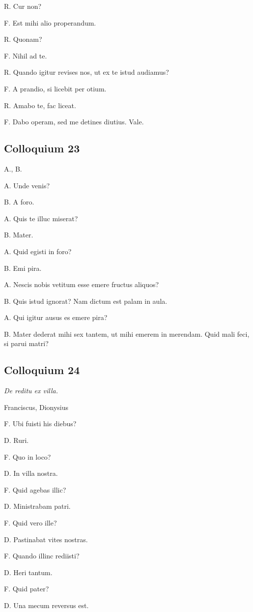 \documentclass{article}
\begin{document}
R. Cur non?

F. Est mihi alio properandum. 

R. Quonam?

F. Nihil ad te. 

R. Quando igitur revises nos, ut ex te istud audiamus?

F. A prandio, si licebit per otium. 

R. Amabo te, fac liceat. 

F. Dabo operam, sed me detines diutius. Vale. 

\subsection{Colloquium 23}
A., B.

A. Unde venis? 

B. A foro.  

A. Quis te illuc miserat? 

B. Mater. 

A. Quid egisti in foro? 

B. Emi pira.  

A. Nescis nobis vetitum esse emere fructus aliquos? 

B. Quis istud ignorat? Nam dictum est palam in aula.

A. Qui igitur ausus es emere pira? 

B. Mater dederat mihi sex tantem, ut mihi emerem in merendam. Quid mali feci, si parui matri? 

\subsection{Colloquium 24}
\emph{De reditu ex villa.}

Franciscus, Dionysius

F. Ubi fuisti his diebus?

D. Ruri. 

F. Quo in loco?

D. In villa nostra. 

F. Quid agebas illic?

D. Ministrabam patri. 

F. Quid vero ille?

D. Pastinabat vites nostras. 

F. Quando illinc rediisti?

D. Heri tantum. 

F. Quid pater?

D. Una mecum reversus est.
\end{document}
